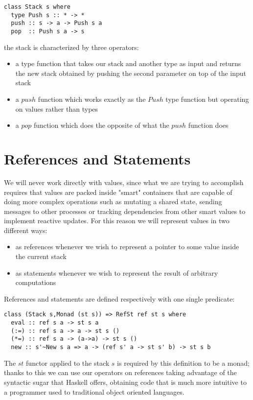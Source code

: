 \begin{verbatim}
class Stack s where
  type Push s :: * -> *
  push :: s -> a -> Push s a
  pop  :: Push s a -> s
\end{verbatim}

the stack is characterized by three operators:
\begin{itemize}
\item a type function that takes our stack and another type as input and returns the new stack obtained by pushing the second parameter 
on top of the input stack
\item a $push$ function which works exactly as the $Push$ type function but operating on values rather than types
\item a $pop$ function which does the opposite of what the $push$ function does
\end{itemize}


\section{References and Statements}
We will never work directly with values, since what we are trying to accomplish requires that values are packed inside "smart" containers
that are capable of doing more complex operations such as mutating a shared state, sending messages to other processes or tracking dependencies
from other smart values to implement reactive updates. For this reason we will represent values in two different ways:
\begin{itemize}
\item as references whenever we wish to represent a pointer to some value inside the current stack
\item as statements whenever we wish to represent the result of arbitrary computations
\end{itemize}

References and statements are defined respectively with one single predicate:

\begin{verbatim}
class (Stack s,Monad (st s)) => RefSt ref st s where
  eval :: ref s a -> st s a
  (:=) :: ref s a -> a -> st s ()
  (*=) :: ref s a -> (a->a) -> st s ()
  new :: s'~New s a => a -> (ref s' a -> st s' b) -> st s b
\end{verbatim}

The $st$ functor applied to the stack $s$ is required by this definition to be a monad; thanks to this we can use our operators on references
taking advantage of the syntactic sugar that Haskell offers, obtaining code that is much more intuitive to a programmer used to traditional
object oriented languages.

